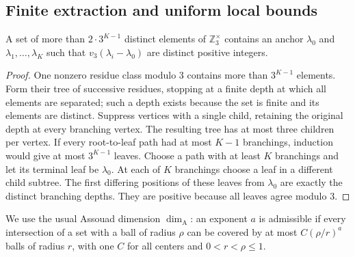 \subsection{Finite extraction and uniform local bounds}

\begin{lemma}
\label{gen:unit-tree}
A set of more than $2\cdot3^{K-1}$ distinct elements of
$\mathbb Z_3^\times$ contains an anchor $\lambda_0$ and
$\lambda_1,\ldots,\lambda_K$ such that
$v_3(\lambda_i-\lambda_0)$ are distinct positive integers.
\end{lemma}
\begin{proof}
One nonzero residue class modulo $3$ contains more than $3^{K-1}$
elements.  Form their tree of successive residues, stopping at a
finite depth at which all elements are separated; such a depth
exists because the set is finite and its elements are distinct.
Suppress vertices with a single child, retaining the original
depth at every branching vertex.  The resulting tree has at most
three children per vertex.  If every root-to-leaf path had at most
$K-1$ branchings, induction would give at most $3^{K-1}$ leaves.
Choose a path with at least $K$ branchings and let its terminal
leaf be $\lambda_0$.  At each of $K$ branchings choose a leaf in
a different child subtree.  The first differing positions of these
leaves from $\lambda_0$ are exactly the distinct branching depths.
They are positive because all leaves agree modulo $3$.
\end{proof}

We use the usual Assouad dimension $\dim_{\mathrm A}$: an exponent
$a$ is admissible if every intersection of a set with a ball of
radius $\rho$ can be covered by at most $C(\rho/r)^a$ balls of
radius $r$, with one $C$ for all centers and $0<r<\rho\le1$.

